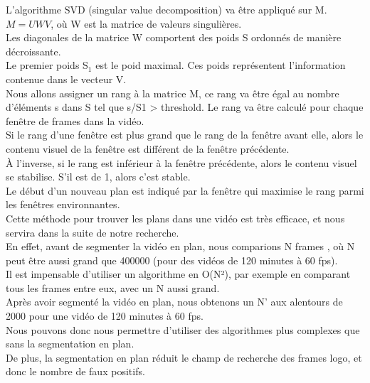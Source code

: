 \documentclass[11pt]{article}
\begin{document}
L'algorithme SVD (singular value decomposition) va être appliqué sur M.  \(M = UWV\), où W est la matrice de valeurs singulières.\\

Les diagonales de la matrice W comportent des poids S ordonnés de manière décroissante.\\
Le premier poids S\(_{\text{1}}\) est le poid maximal. Ces poids représentent l'information contenue dans le vecteur V.\\

Nous allons assigner un rang à la matrice M,  ce rang va être égal au nombre d'éléments s dans S tel que s/S1 > threshold. Le rang va être calculé pour chaque fenêtre de frames dans la vidéo.\\

Si le rang d'une fenêtre est plus grand que le rang de la fenêtre avant elle, alors le contenu visuel de la fenêtre est différent de la fenêtre précédente.\\
À l'inverse, si le rang est inférieur à la fenêtre précédente, alors le contenu visuel se stabilise. S'il est de 1, alors c'est stable.\\

Le début d'un nouveau plan est indiqué par la fenêtre qui maximise le rang parmi les fenêtres environnantes.\\

Cette méthode pour trouver les plans dans une vidéo est très efficace, et nous servira dans la suite de notre recherche.\\

En effet, avant de segmenter la vidéo en plan, nous comparions  N frames , où N peut être aussi grand que 400000 (pour des vidéos de 120 minutes à 60 fps).\\
Il est impensable d’utiliser un algorithme en O(N²), par exemple en comparant tous les frames entre eux, avec un N aussi grand.\\

Après avoir segmenté la vidéo en plan, nous obtenons un N’ aux alentours de 2000 pour une vidéo de 120 minutes à 60 fps.\\
Nous pouvons donc nous permettre d’utiliser des algorithmes plus complexes que sans la segmentation en plan.\\
De plus, la segmentation en plan réduit le champ de recherche des frames logo, et donc le nombre de faux positifs.\\
\end{document}

